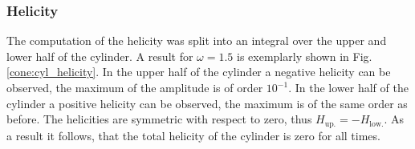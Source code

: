 \subsubsection{Helicity}

The computation of the helicity was split into an integral over the upper and lower half
of the cylinder.  A result for $\omega=1.5$ is exemplarly shown in Fig. \ref{cone:cyl_helicity}.
In the upper half of the cylinder a negative helicity can be observed, the maximum of the amplitude is of order $10^{-1}$.
In the lower half of the cylinder a positive helicity can be observed, the maximum is of the same order as before.
The helicities are symmetric with respect to zero, thus $H_{\text{up.}} = -H_{\text{low.}}$.
As a result it follows, that the total helicity of the cylinder is zero for all times.

